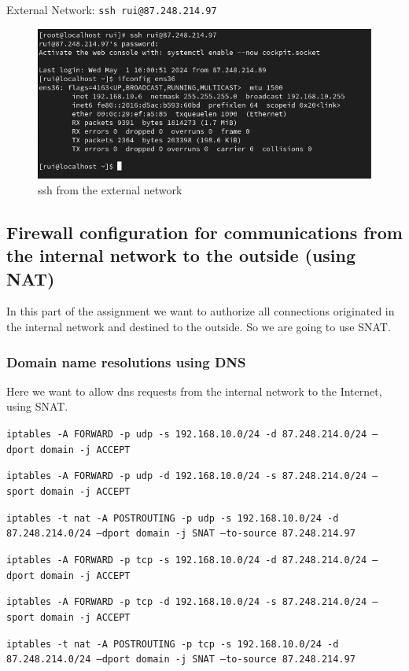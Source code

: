 \documentclass{article}
\begin{document}
\texttt{}\par
\texttt{}\par
External Network: \texttt{ssh rui@87.248.214.97} \par
\texttt{}\par
\begin{figure}[H]
    \centering
    \includegraphics[scale=0.5]{out/out_ssh_from_dns_servers.png}
    \caption{ssh from the external network}
    \label{fig:network-arc}
\end{figure}


\subsection{Firewall configuration for communications from the internal network to the outside (using NAT)}
\texttt{}\par In this part of the assignment we want to authorize all connections originated in the internal network and destined to the outside. So we are going to use SNAT.
\subsubsection{Domain name resolutions using DNS}
\texttt{}\par Here we want to allow dns requests from the internal network to the Internet, using SNAT.


\texttt{}\par
\texttt{iptables -A FORWARD -p udp -s 192.168.10.0/24 -d 87.248.214.0/24 --dport domain -j ACCEPT}\par
\texttt{iptables -A FORWARD -p udp -d 192.168.10.0/24 -s 87.248.214.0/24 --sport domain -j ACCEPT}\par
\texttt{iptables -t nat -A POSTROUTING -p udp -s 192.168.10.0/24 -d 87.248.214.0/24 --dport domain -j SNAT --to-source 87.248.214.97}\par
\texttt{iptables -A FORWARD -p tcp -s 192.168.10.0/24 -d 87.248.214.0/24 --dport domain -j ACCEPT}\par
\texttt{iptables -A FORWARD -p tcp -d 192.168.10.0/24 -s 87.248.214.0/24 --sport domain -j ACCEPT}\par
\texttt{iptables -t nat -A POSTROUTING -p tcp -s 192.168.10.0/24 -d 87.248.214.0/24 --dport domain -j SNAT --to-source 87.248.214.97}\par
\texttt{}\par
\end{document}

